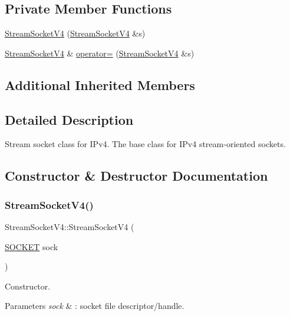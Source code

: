 \subsection*{Private Member Functions}
\begin{DoxyCompactItemize}
\item 
\hyperlink{classStreamSocketV4_a110cb2262536a3882f78c3b7e763bc5d}{Stream\+Socket\+V4} (\hyperlink{classStreamSocketV4}{Stream\+Socket\+V4} \&s)
\item 
\hyperlink{classStreamSocketV4}{Stream\+Socket\+V4} \& \hyperlink{classStreamSocketV4_a4fd37e1d2fd0b358c3a7d9b4e7f4d2e6}{operator=} (\hyperlink{classStreamSocketV4}{Stream\+Socket\+V4} \&s)
\end{DoxyCompactItemize}
\subsection*{Additional Inherited Members}


\subsection{Detailed Description}
Stream socket class for I\+Pv4. The base class for I\+Pv4 stream-\/oriented sockets. 

\subsection{Constructor \& Destructor Documentation}
\mbox{\label{classStreamSocketV4_a00d0a62cc92c6c9a3a29acba866e6483}} 
\subsubsection{\texorpdfstring{Stream\+Socket\+V4()}{StreamSocketV4()}\hspace{0.1cm}{\footnotesize\ttfamily [1/3]}}
{\footnotesize\ttfamily Stream\+Socket\+V4\+::\+Stream\+Socket\+V4 (\begin{DoxyParamCaption}\item[{\hyperlink{sockclasslib_8h_a8dc8083897335125630f1af5dafd5831}{S\+O\+C\+K\+ET}}]{sock }\end{DoxyParamCaption})}

Constructor. 
\begin{DoxyParams}{Parameters}
{\em sock} & \+: socket file descriptor/handle. \\
\hline
\end{DoxyParams}
\mbox{\label{classStreamSocketV4_a6a4b3d769b87c755698b8500942cbdf6}} 
